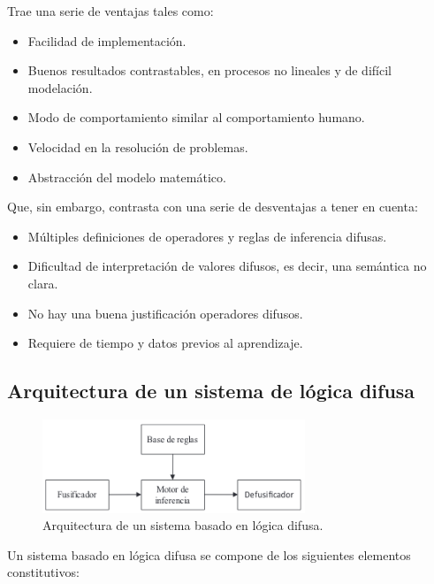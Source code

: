 \documentclass[a4paper, 11pt, titlepage]{article}
\begin{document}
    Trae una serie de ventajas tales como:

    \begin{itemize}
        \item Facilidad de implementación.
        \item Buenos resultados contrastables, en procesos no lineales y de difícil modelación.
        \item Modo de comportamiento similar al comportamiento humano.
        \item Velocidad en la resolución de problemas.
        \item Abstracción del modelo matemático.
    \end{itemize}

    Que, sin embargo, contrasta con una serie de desventajas a tener en cuenta:

    \begin{itemize}
        \item Múltiples definiciones de operadores y reglas de inferencia difusas.
        \item Dificultad de interpretación de valores difusos, es decir, una semántica no clara.
        \item No hay una buena justificación operadores difusos.
        \item Requiere de tiempo y datos previos al aprendizaje.
    \end{itemize}

    \subsection{Arquitectura de un sistema de lógica difusa}

        \begin{figure}[htp]
            \centering
            \includegraphics[width=0.7\textwidth]{resources/logicadifusa.png}
            \caption{Arquitectura de un sistema basado en lógica difusa.}
            \label{logicadifusa}
        \end{figure}

        Un sistema basado en lógica difusa se compone de los siguientes elementos constitutivos:
\end{document}
